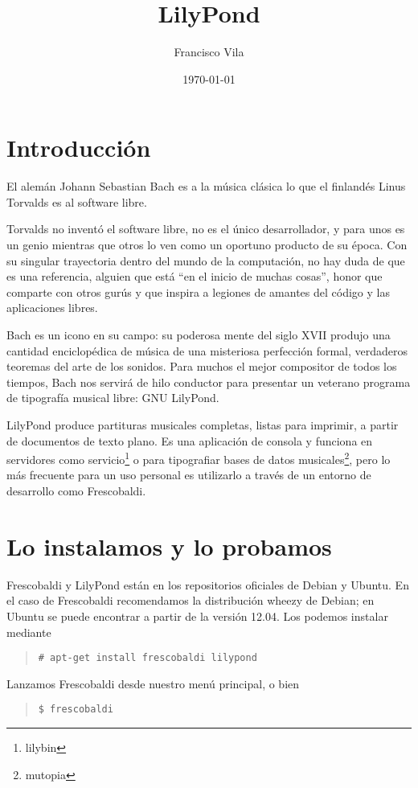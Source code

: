 \documentclass[a4paper,10pt,oneside,headinclude,titlepage]{article} %
\title{LilyPond}
\author{Francisco Vila}
\date{\today}
\begin{document}
\section{Introducción}

El alemán Johann Sebastian Bach es a la música clásica lo que el
finlandés Linus Torvalds es al software libre.

Torvalds no inventó el software libre, no es el único desarrollador, y
para unos es un genio mientras que otros lo ven como un oportuno
producto de su época. Con su singular trayectoria dentro del mundo de
la computación, no hay duda de que es una referencia, alguien que está
``en el inicio de muchas cosas'', honor que comparte con otros gurús y
que inspira a legiones de amantes del código y las aplicaciones
libres.

Bach es un icono en su campo: su poderosa mente del siglo XVII produjo
una cantidad enciclopédica de música de una misteriosa perfección
formal, verdaderos teoremas del arte de los sonidos. Para muchos el
mejor compositor de todos los tiempos, Bach nos servirá de hilo
conductor para presentar un veterano programa de tipografía musical
libre: GNU LilyPond.

LilyPond produce partituras musicales completas, listas para imprimir,
a partir de documentos de texto plano.  Es una aplicación de consola y
funciona en servidores como servicio\footnote{lilybin} o para
tipografiar bases de datos musicales\footnote{mutopia}, pero lo más
frecuente para un uso personal es utilizarlo a través de un entorno de
desarrollo como Frescobaldi.

\section{Lo instalamos y lo probamos}

Frescobaldi y LilyPond están en los repositorios oficiales de Debian y
Ubuntu. En el caso de Frescobaldi recomendamos la distribución wheezy
de Debian; en Ubuntu se puede encontrar a partir de la versión
12.04. Los podemos instalar mediante

\begin{quote}
\verb+# apt-get install frescobaldi lilypond+
\end{quote}

Lanzamos Frescobaldi desde nuestro menú principal, o bien

\begin{quote}
\verb+$ frescobaldi+
\end{quote}
\end{document}
